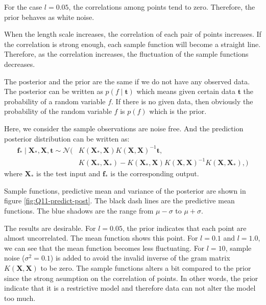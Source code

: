 \documentclass[12pt]{article}
\newenvironment{question}[2][Question]{\begin{trivlist}
\kern10pt
\item[\hskip \labelsep {\bfseries #1}\hskip \labelsep {\bfseries #2.}]}{\end{trivlist}}
\begin{document}
\begin{question}{10}
For the case $l = 0.05$, the correlations among points tend to zero. Therefore,
the prior behaves as white noise.

When the length scale increases, the correlation of each pair of points increases.
If the correlation is strong enough, each sample function will become a straight line.
Therefore, as the correlation increases, the fluctuation of the sample functions decreases.
\end{question}

\begin{question}{11}
The posterior and the prior are the same if we do not have any observed data.
The posterior can be written as $p(f\mid \mathbf{t})$ which means given certain data
$\mathbf{t}$ the probability of a random variable $f$. 
If there is no given data, then obviously
the probability of the random variable $f$ is $p(f)$ which is the prior.

Here, we consider the sample observations are noise free.
And the prediction posterior distribution can be written as:
\begin{align*}
  \mathbf{f}_{*} \mid \mathbf{X}_{*}, \mathbf{X}, \mathbf{t} \sim \mathcal{N}(&
    K(\mathbf{X}_*, \mathbf{X})K(\mathbf{X}, \mathbf{X})^{-1}\mathbf{t}, \\
    &K(\mathbf{X}_*, \mathbf{X}_*) 
      - K(\mathbf{X}_*, \mathbf{X})K(\mathbf{X}, \mathbf{X})^{-1}K(\mathbf{X}, \mathbf{X}_*),
  )
\end{align*}
where $\mathbf{X}_*$ is the test input and $\mathbf{f}_{*}$ is the corresponding output.

Sample functions, predictive mean and variance of the posterior are shown in 
figure \ref{fig:Q11-predict-post}. The black dash lines are the predictive mean
functions. The blue shadows are the range from $\mu - \sigma$ to $\mu + \sigma$.

The results are desirable. For $l = 0.05$, the prior indicates that each point 
are almost uncorrelated. The mean function shows this point. For $l = 0.1$ and $l = 1.0$,
we can see that the mean function becomes less fluctuating. For $l = 10$, sample
noise ($\sigma^2 = 0.1$) is added to avoid the invalid inverse of the gram matrix
$K(\mathbf{X}, \mathbf{X})$ to be zero. 
The sample functions alters a bit compared to the prior since the strong asumption
on the correlation of points. In other words, the prior indicate that it is a 
restrictive model and therefore data can not alter the model too much.


\end{question}
\end{document}
